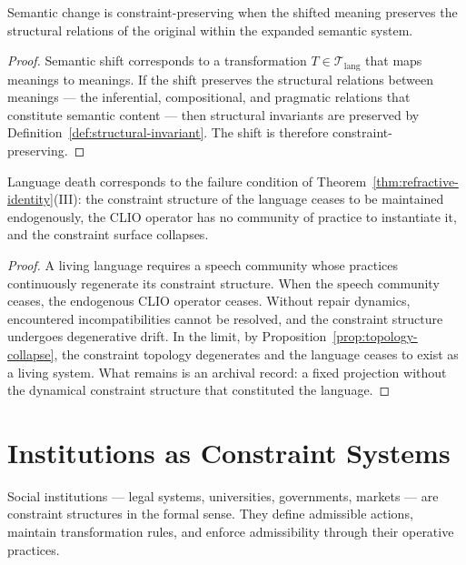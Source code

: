 \documentclass[11pt,openany]{book}
\begin{document}
\begin{proposition}
\label{prop:semantic-shift}
Semantic change is constraint-preserving when the shifted
meaning preserves the structural relations of the original
within the expanded semantic system.
\end{proposition}

\begin{proof}
Semantic shift corresponds to a transformation $T \in
\mathcal{T}_{\mathrm{lang}}$ that maps meanings to meanings.
If the shift preserves the structural relations between
meanings — the inferential, compositional, and pragmatic
relations that constitute semantic content — then structural
invariants are preserved by
Definition~\ref{def:structural-invariant}.  The shift is
therefore constraint-preserving.
\end{proof}

\begin{proposition}
\label{prop:language-death}
Language death corresponds to the failure condition of
Theorem~\ref{thm:refractive-identity}(III): the constraint
structure of the language ceases to be maintained
endogenously, the CLIO operator has no community of
practice to instantiate it, and the constraint surface
collapses.
\end{proposition}

\begin{proof}
A living language requires a speech community whose
practices continuously regenerate its constraint structure.
When the speech community ceases, the endogenous CLIO
operator ceases.  Without repair dynamics, encountered
incompatibilities cannot be resolved, and the constraint
structure undergoes degenerative drift.  In the limit, by
Proposition~\ref{prop:topology-collapse}, the constraint
topology degenerates and the language ceases to exist as a
living system.  What remains is an archival record: a
fixed projection without the dynamical constraint structure
that constituted the language.
\end{proof}

\section{Institutions as Constraint Systems}
\label{sec:institutions}

Social institutions — legal systems, universities,
governments, markets — are constraint structures in the
formal sense.  They define admissible actions, maintain
transformation rules, and enforce admissibility through
their operative practices.
\end{document}
